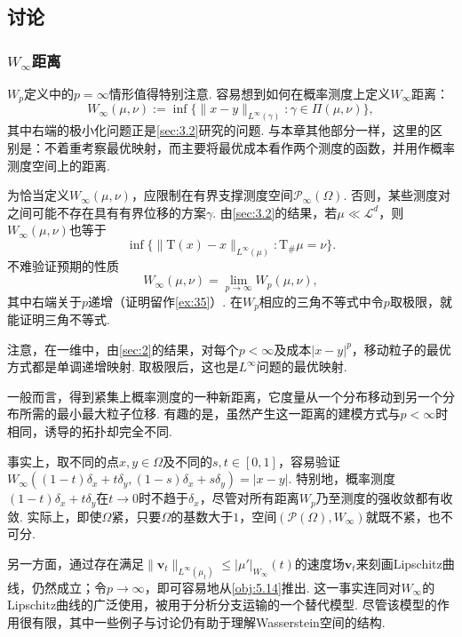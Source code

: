 \subsection{讨论}\label{sec:5.5}

\subsubsection[无穷阶Wasserstein距离]{$W_\infty$距离}\label{sec:5.5.1}

$W_p$定义中的$p=\infty$情形值得特别注意. 容易想到如何在概率测度上定义$W_\infty$距离：
\[
W_\infty(\mu,\nu):=\inf\{\|x-y\|_{L^\infty(\gamma)}:\gamma\in\Pi(\mu,\nu)\},
\]
其中右端的极小化问题正是\autoref{sec:3.2}研究的问题. 与本章其他部分一样，这里的区别是：不着重考察最优映射，而主要将最优成本看作两个测度的函数，并用作概率测度空间上的距离.

为恰当定义$W_\infty(\mu,\nu)$，应限制在有界支撑测度空间$\mathscr P_\infty(\Omega)$. 否则，某些测度对之间可能不存在具有有界位移的方案$\gamma$. 由\autoref{sec:3.2}的结果，若$\mu\ll\mathscr L^d$，则$W_\infty(\mu,\nu)$也等于
\[
\inf\{\|\mathrm T(x)-x\|_{L^\infty(\mu)}:\mathrm T_\#\mu=\nu\}.
\]
不难验证预期的性质
\[
W_\infty(\mu,\nu)=\lim_{p\to\infty}W_p(\mu,\nu),
\]
其中右端关于$p$递增（证明留作\autoref{ex:35}）. 在$W_p$相应的三角不等式中令$p$取极限，就能证明三角不等式.

注意，在一维中，由\autoref{sec:2}的结果，对每个$p<\infty$及成本$|x-y|^p$，移动粒子的最优方式都是单调递增映射. 取极限后，这也是$L^\infty$问题的最优映射.

一般而言，得到紧集上概率测度的一种新距离，它度量从一个分布移动到另一个分布所需的最小最大粒子位移. 有趣的是，虽然产生这一距离的建模方式与$p<\infty$时相同，诱导的拓扑却完全不同.

事实上，取不同的点$x,y\in\Omega$及不同的$s,t\in[0,1]$，容易验证
$W_\infty((1-t)\delta_x+t\delta_y,(1-s)\delta_x+s\delta_y)=|x-y|$.
特别地，概率测度$(1-t)\delta_x+t\delta_y$在$t\to0$时不趋于$\delta_x$，尽管对所有距离$W_p$乃至测度的强收敛都有收敛. 实际上，即使$\Omega$紧，只要$\Omega$的基数大于$1$，空间$(\mathscr P(\Omega),W_\infty)$就既不紧，也不可分.

另一方面，通过存在满足$\|\mathbf v_t\|_{L^\infty(\mu_t)}\le|\mu'|_{W_\infty}(t)$的速度场$\mathbf v_t$来刻画Lipschitz曲线，仍然成立；令$p\to\infty$，即可容易地从\autoref{obj:5.14}推出. 这一事实连同对$W_\infty$的Lipschitz曲线的广泛使用，被\cite{b79}用于分析分支运输的一个替代模型. 尽管该模型的作用很有限，其中一些例子与讨论仍有助于理解Wasserstein空间的结构.

